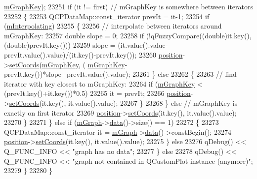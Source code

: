 \begin{DoxyCode}
      \hyperlink{class_q_c_p_item_tracer_a8fa20f2e9ee07d21fd7c8d30ba4702ca}{mGraphKey});
23251           \textcolor{keywordflow}{if} (it != first) \textcolor{comment}{// mGraphKey is somewhere between iterators}
23252           \{
23253             QCPDataMap::const\_iterator prevIt = it-1;
23254             \textcolor{keywordflow}{if} (\hyperlink{class_q_c_p_item_tracer_afab37c22ad39f235921e86f93cd84595}{mInterpolating})
23255             \{
23256               \textcolor{comment}{// interpolate between iterators around mGraphKey:}
23257               \textcolor{keywordtype}{double} slope = 0;
23258               \textcolor{keywordflow}{if} (!qFuzzyCompare((\textcolor{keywordtype}{double})it.key(), (double)prevIt.key()))
23259                 slope = (it.value().value-prevIt.value().value)/(it.key()-prevIt.key());
23260               \hyperlink{class_q_c_p_item_tracer_a69917e2fdb2b3a929c196958feee7cbe}{position}->\hyperlink{class_q_c_p_item_position_aa988ba4e87ab684c9021017dcaba945f}{setCoords}(\hyperlink{class_q_c_p_item_tracer_a8fa20f2e9ee07d21fd7c8d30ba4702ca}{mGraphKey}, (
      \hyperlink{class_q_c_p_item_tracer_a8fa20f2e9ee07d21fd7c8d30ba4702ca}{mGraphKey}-prevIt.key())*slope+prevIt.value().value);
23261             \} \textcolor{keywordflow}{else}
23262             \{
23263               \textcolor{comment}{// find iterator with key closest to mGraphKey:}
23264               \textcolor{keywordflow}{if} (\hyperlink{class_q_c_p_item_tracer_a8fa20f2e9ee07d21fd7c8d30ba4702ca}{mGraphKey} < (prevIt.key()+it.key())*0.5)
23265                 it = prevIt;
23266               \hyperlink{class_q_c_p_item_tracer_a69917e2fdb2b3a929c196958feee7cbe}{position}->\hyperlink{class_q_c_p_item_position_aa988ba4e87ab684c9021017dcaba945f}{setCoords}(it.key(), it.value().value);
23267             \}
23268           \} \textcolor{keywordflow}{else} \textcolor{comment}{// mGraphKey is exactly on first iterator}
23269             \hyperlink{class_q_c_p_item_tracer_a69917e2fdb2b3a929c196958feee7cbe}{position}->\hyperlink{class_q_c_p_item_position_aa988ba4e87ab684c9021017dcaba945f}{setCoords}(it.key(), it.value().value);
23270         \}
23271       \} \textcolor{keywordflow}{else} \textcolor{keywordflow}{if} (\hyperlink{class_q_c_p_item_tracer_a2d70cf616b579563aa15f796dfc143ac}{mGraph}->\hyperlink{class_q_c_p_graph_a2f58436df4f86a2792b776a21642b3d9}{data}()->size() == 1)
23272       \{
23273         QCPDataMap::const\_iterator it = \hyperlink{class_q_c_p_item_tracer_a2d70cf616b579563aa15f796dfc143ac}{mGraph}->\hyperlink{class_q_c_p_graph_a2f58436df4f86a2792b776a21642b3d9}{data}()->constBegin();
23274         \hyperlink{class_q_c_p_item_tracer_a69917e2fdb2b3a929c196958feee7cbe}{position}->\hyperlink{class_q_c_p_item_position_aa988ba4e87ab684c9021017dcaba945f}{setCoords}(it.key(), it.value().value);
23275       \} \textcolor{keywordflow}{else}
23276         qDebug() << Q\_FUNC\_INFO << \textcolor{stringliteral}{"graph has no data"};
23277     \} \textcolor{keywordflow}{else}
23278       qDebug() << Q\_FUNC\_INFO << \textcolor{stringliteral}{"graph not contained in QCustomPlot instance (anymore)"};
23279   \}
23280 \}
\end{DoxyCode}


